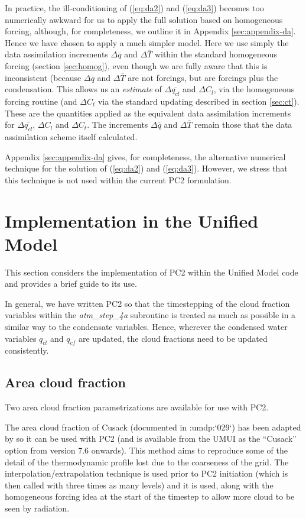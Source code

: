 \documentclass{UMDP_article}
\newcommand{\citeumdp}[1]{:umdp:`#1`}
\begin{document}
In practice, the ill-conditioning of (\ref{eq:da2}) and (\ref{eq:da3}) becomes too
numerically awkward for us to apply the full solution based on homogeneous
forcing, although, for completeness, we outline it in Appendix
\ref{sec:appendix-da}. Hence we have
chosen to apply a much simpler model. Here we use simply the data assimilation
increments $\Delta \overline{q}$ and $\Delta \overline{T}$ within the standard
homogeneous forcing (section \ref{sec:homog}), even though we are fully
aware that this is inconsistent (because $\Delta \overline{q}$ and $\Delta
\overline{T}$ are not forcings, but are forcings plus the condensation.
This allows us an \textit{estimate} of $\Delta \overline{q_{cl}}$ and $\Delta{C_l}$,
via the homogeneous forcing routine (and $\Delta C_t$ via the standard
updating described in section \ref{sec:ct}). These are the quantities applied
as the equivalent data assimilation increments for $\Delta \overline{q_{cl}}$,
$\Delta{C_l}$ and $\Delta C_t$. The increments $\Delta \overline{q}$ and
$\Delta \overline{T}$ remain those that the data assimilation scheme itself
calculated.

Appendix \ref{sec:appendix-da} gives, for completeness, the alternative
numerical technique for the solution of (\ref{eq:da2}) and (\ref{eq:da3}).
However, we stress that this technique is not used within the current
PC2 formulation.

\section{Implementation in the Unified Model}
\label{sec:um}

This section considers the implementation of PC2 within the Unified Model
code and provides a brief guide to its use.

In general, we have written PC2 so that the timestepping of the
cloud fraction variables within the \textit{atm\_step\_4a}
subroutine is treated as much as possible in a similar way to
the condensate variables.
Hence, wherever the condensed water variables $q_{cl}$ and $q_{cf}$
are updated, the cloud fractions need to be updated consistently.

\subsection{Area cloud fraction}
\label{sec:acf}

Two area cloud fraction parametrizations are available for use with PC2.

The area cloud fraction of Cusack (documented in \citeumdp{029}) has been 
adapted by \cite{boutle_morcrette10} so it can be used with PC2 (and is available from the UMUI as the 
``Cusack'' option from version 7.6 onwards). This method aims to 
reproduce some of the detail of the thermodynamic 
profile lost due to the coarseness of the grid. The interpolation/extrapolation technique is
used prior to PC2 initiation (which is then called with three times as many levels)
and it is used, along with the homogeneous forcing idea at the start of the timestep to
allow more cloud to be seen by radiation.
\end{document}
